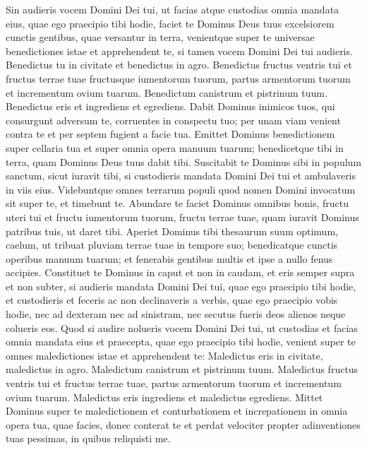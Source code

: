 \begin{biblechapter} 
\verse Sin audieris vocem Domini Dei tui, ut facias atque custodias omnia mandata eius, quae ego praecipio tibi hodie, faciet te Dominus Deus tuus excelsiorem cunctis gentibus, quae versantur in terra, 
\verse venientque super te universae benedictiones istae et apprehendent te, si tamen vocem Domini Dei tui audieris. 
\verse Benedictus tu in civitate et benedictus in agro. 
\verse Benedictus fructus ventris tui et fructus terrae tuae fructusque iumentorum tuorum, partus armentorum tuorum et incrementum ovium tuarum. 
\verse Benedictum canistrum et pistrinum tuum. 
\verse Benedictus eris et ingrediens et egrediens. 
\verse Dabit Dominus inimicos tuos, qui consurgunt adversum te, corruentes in conspectu tuo; per unam viam venient contra te et per septem fugient a facie tua. 
\verse Emittet Dominus benedictionem super cellaria tua et super omnia opera manuum tuarum; benedicetque tibi in terra, quam Dominus Deus tuus dabit tibi. 
\verse Suscitabit te Dominus sibi in populum sanctum, sicut iuravit tibi, si custodieris mandata Domini Dei tui et ambulaveris in viis eius. 
\verse Videbuntque omnes terrarum populi quod nomen Domini invocatum sit super te, et timebunt te. 
\verse Abundare te faciet Dominus omnibus bonis, fructu uteri tui et fructu iumentorum tuorum, fructu terrae tuae, quam iuravit Dominus patribus tuis, ut daret tibi. 
\verse Aperiet Dominus tibi thesaurum suum optimum, caelum, ut tribuat pluviam terrae tuae in tempore suo; benedicatque cunctis operibus manuum tuarum; et fenerabis gentibus multis et ipse a nullo fenus accipies. 
\verse Constituet te Dominus in caput et non in caudam, et eris semper supra et non subter, si audieris mandata Domini Dei tui, quae ego praecipio tibi hodie, et custodieris et feceris 
\verse ac non declinaveris a verbis, quae ego praecipio vobis hodie, nec ad dexteram nec ad sinistram, nec secutus fueris deos alienos neque colueris eos. 
\verse Quod si audire nolueris vocem Domini Dei tui, ut custodias et facias omnia mandata eius et praecepta, quae ego praecipio tibi hodie, venient super te omnes maledictiones istae et apprehendent te: 
\verse Maledictus eris in civitate, maledictus in agro. 
\verse Maledictum canistrum et pistrinum tuum. 
\verse Maledictus fructus ventris tui et fructus terrae tuae, partus armentorum tuorum et incrementum ovium tuarum. 
\verse Maledictus eris ingrediens et maledictus egrediens. 
\verse Mittet Dominus super te maledictionem et conturbationem et increpationem in omnia opera tua, quae facies, donec conterat te et perdat velociter propter adinventiones tuas pessimas, in quibus reliquisti me. 

\end{biblechapter}
